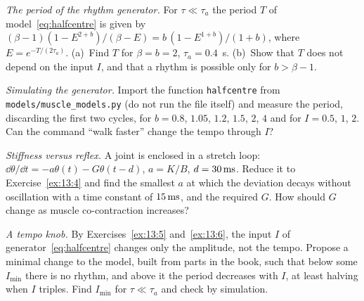 \begin{exercise}[\lvlB]
\label{ex:13:5}
\emph{The period of the rhythm generator.} For $\tau\ll\tau_a$ the period $T$ of model~\eqref{eq:halfcentre} is given by $(\beta-1)(1-E^{2+b})/(\beta-E)=b\,(1-E^{1+b})/(1+b)$, where $E=e^{-T/(2\tau_a)}$. (a)~Find $T$ for $\beta=b=2$, $\tau_a=0.4$~s. (b)~Show that $T$ does not depend on the input $I$, and that a rhythm is possible only for $b>\beta-1$.
\end{exercise}

\begin{exercise}[\lvlB]
\label{ex:13:6}
\emph{Simulating the generator.} Import the function \texttt{halfcentre} from \texttt{models/\allowbreak muscle\_models.py} (do not run the file itself) and measure the period, discarding the first two cycles, for $b=0.8$, $1.05$, $1.2$, $1.5$, $2$, $4$ and for $I=0.5$, $1$, $2$. Can the command ``walk faster'' change the tempo through $I$?
\end{exercise}

\begin{exercise}[\lvlB]
\label{ex:13:7}
\emph{Stiffness versus reflex.} A joint is enclosed in a stretch loop: $\dd\theta/\dd t=-a\theta(t)-G\theta(t-d)$, $a=K/B$, $d=30\,\text{ms}$. Reduce it to Exercise~\ref{ex:13:4} and find the smallest $a$ at which the deviation decays without oscillation with a time constant of $15\,\text{ms}$, and the required $G$. How should $G$ change as muscle co-contraction increases?
\end{exercise}

\begin{exercise}[\lvlC]
\label{ex:13:8}
\emph{A tempo knob.} By Exercises~\ref{ex:13:5} and~\ref{ex:13:6}, the input $I$ of generator~\eqref{eq:halfcentre} changes only the amplitude, not the tempo. Propose a minimal change to the model, built from parts in the book, such that below some $I_{\min}$ there is no rhythm, and above it the period decreases with $I$, at least halving when $I$ triples. Find $I_{\min}$ for $\tau\ll\tau_a$ and check by simulation.
\end{exercise}
